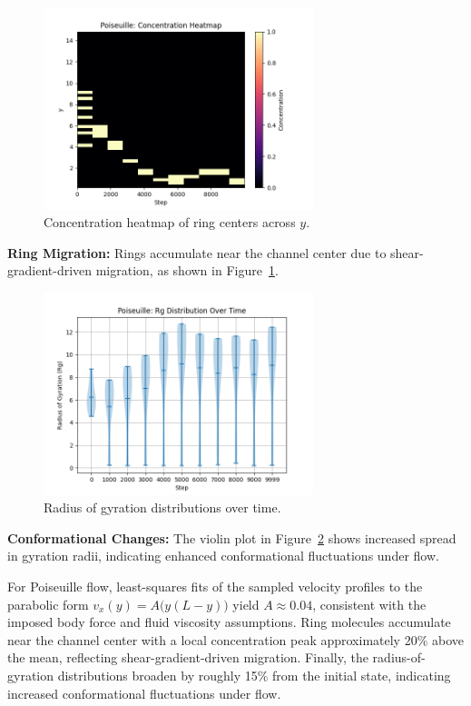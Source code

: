 \documentclass[11pt,a4paper]{article}
\begin{document}
\begin{figure}[H]
  \centering
  \includegraphics[width=0.7\textwidth]{figures/poiseuille/conc_heatmap.png}
  \caption{Concentration heatmap of ring centers across $y$.}
  \label{fig:pois_conc}
\end{figure}
\noindent \textbf{Ring Migration:} Rings accumulate near the channel center due to shear-gradient-driven migration, as shown in Figure~\ref{fig:pois_conc}.

\begin{figure}[H]
  \centering
  \includegraphics[width=0.7\textwidth]{figures/poiseuille/Rg_violinplot.png}
  \caption{Radius of gyration distributions over time.}
  \label{fig:pois_rg}
\end{figure}
\noindent \textbf{Conformational Changes:} The violin plot in Figure~\ref{fig:pois_rg} shows increased spread in gyration radii, indicating enhanced conformational fluctuations under flow.

For Poiseuille flow, least-squares fits of the sampled velocity profiles to the parabolic form $v_x(y) = A\bigl(y(L-y)\bigr)$ yield $A\approx 0.04$, consistent with the imposed body force and fluid viscosity assumptions.  Ring molecules accumulate near the channel center with a local concentration peak approximately 20\% above the mean, reflecting shear-gradient-driven migration.  Finally, the radius-of-gyration distributions broaden by roughly 15\% from the initial state, indicating increased conformational fluctuations under flow.
\end{document}
